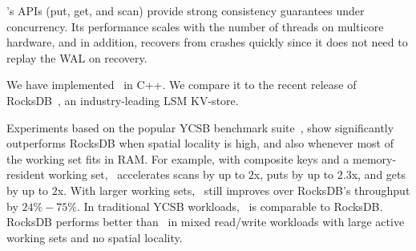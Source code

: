 \sys's APIs (put, get, and scan) provide strong consistency guarantees 
under concurrency.  Its performance scales with the number of threads on multicore hardware, 
and
in addition, \sys\/ recovers from crashes quickly since it does not need to replay the WAL on recovery.

We have implemented \sys\ in C++. 
We compare it to the recent release of RocksDB~\cite{RocksDB}, 
an industry-leading LSM KV-store.

Experiments based on the popular YCSB benchmark suite~\cite{YCSB}, 
show \sys\/ significantly outperforms RocksDB when spatial  locality is high, and also 
whenever most of the working set fits in RAM. For example, with composite keys and a memory-resident 
working set, \sys\  accelerates scans by up to $2$x, puts by up to $2.3$x, and gets by up to $2$x. 
With larger working sets, \sys\ still improves over RocksDB's throughput by $24\% - 75\%$. In traditional
YCSB workloads,  \sys\ is comparable to RocksDB. RocksDB performs better than 
\sys\ in mixed read/write workloads with large active working sets and no spatial locality. 

